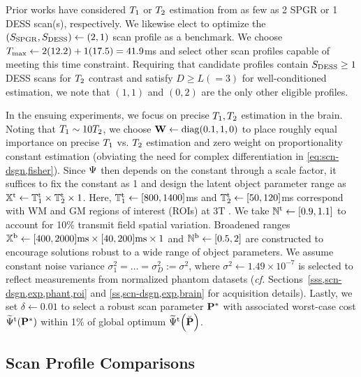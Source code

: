 Prior works have considered $T_1$ or $T_2$ estimation 
from as few as 2 SPGR 
\cite{wang:87:otp, deoni:03:rct} 
or 1 DESS \cite{welsch:09:reo} scan(s), 
respectively. 
We likewise elect to optimize 
the $(S_{\mathrm{SPGR}}, S_{\mathrm{DESS}}) \gets (2,1)$ scan profile 
as a benchmark. 
We choose $T_\mathrm{max} \gets 2(12.2) + 1(17.5) = 41.9$ms 
and select other scan profiles capable 
of meeting this time constraint. 
Requiring that candidate profiles contain $S_{\mathrm{DESS}} \ge 1$ DESS scans 
for $T_2$ contrast and satisfy $D \ge L (=3)$ 
for well-conditioned estimation, 
we note that $(1,1)$ and $(0,2)$ 
are the only other eligible profiles. 

In the ensuing experiments, 
we focus on precise $T_1,T_2$ estimation in the brain.
Noting that $T_1\sim10T_2$, 
we choose $\mathbf{W} \gets \mathrm{diag}\paren{0.1, 1, 0}$ 
to place roughly equal importance 
on precise $T_1$ vs. $T_2$ estimation
and zero weight
on proportionality constant estimation
(obviating the need
for complex differentiation
in \eqref{eq:scn-dsgn,fisher}).
Since $\Psi$ then depends 
on the constant through a scale factor,
it suffices to fix the constant as 1
and design the latent object parameter range
as $\mathbb{X}^\mathrm{t} \gets \mathbb{T}_1^{\mathrm{t}} \times \mathbb{T}_2^{\mathrm{t}} \times 1$.
Here, 
$\mathbb{T}_1^{\mathrm{t}} \gets [800, 1400]$ms
and $\mathbb{T}_2^{\mathrm{t}} \gets [50, 120]$ms
correspond with WM and GM regions of interest (ROIs)
at 3T \cite{wansapura:99:nrt, stanisz:05:ttr}.
We take $\setNt \gets \brac{0.9, 1.1}$ 
to account for 10\% transmit field spatial variation. 
Broadened ranges 
$\mathbb{X}^\mathrm{b} \gets [400, 2000]\text{ms} \times [40, 200]\text{ms} \times 1$ 
and $\mathbb{N}^\mathrm{b} \gets [0.5, 2]$ are constructed 
to encourage solutions robust 
to a wide range of object parameters. 
We assume constant noise variance 
$\sigma_1^2 = \dots = \sigma_D^2 := \sigma^2$, 
where $\sigma^2 \gets 1.49 \times 10^{-7}$ is selected 
to reflect measurements from normalized phantom datasets 
(\emph{cf.} Sections~\ref{sss,scn-dsgn,exp,phant,roi} 
and \ref{ss,scn-dsgn,exp,brain} 
for acquisition details).
Lastly, we set $\delta \gets 0.01$ 
to select a robust scan parameter $\mathbf{P}^*$ 
with associated worst-case cost $\costawt{\bmPs}$ 
within 1\% of global optimum $\costawt{\bmPc}$.

\subsection{Scan Profile Comparisons}
\label{ss,scn-dsgn,opt,compare} 

